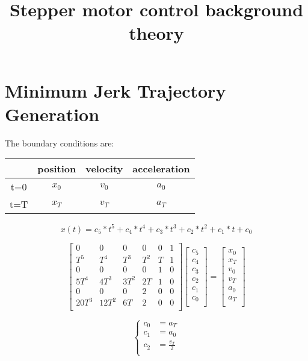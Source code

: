 \documentclass[11pt, a4paper]{article}
\begin{document}
\title{Stepper motor control background theory} 
\date{}
\maketitle


\section{Minimum Jerk Trajectory Generation}


The boundary conditions are:

\begin{center}
    \begin{tabular}{ |c|c|c|c| }
        \hline
            & position & velocity & acceleration \\
        \hline
        t=0 & $x_0$ & $v_0$ & $a_0$ \\
        \hline
        t=T & $x_T$ & $v_T$ & $a_T$ \\
        \hline
    \end{tabular}
    \label{tab:mjt_bc}
\end{center}


\begin{equation}
    x(t) = c_5 * t^5 + c_4 * t^4 + c_3 * t^3 + c_2 * t^2 + c_1 * t + c_0
    \label{eq:mjt_xt}
\end{equation}

\begin{equation}
    \begin{bmatrix}
        0 & 0 & 0 & 0 & 0 & 1 \\
        T^5 & T^4 & T^3 & T^2 & T & 1 \\
        0 & 0 & 0 & 0 & 1 & 0 \\
        5T^4 & 4T^3 & 3T^2 & 2T & 1 & 0 \\
        0 & 0 & 0 & 2 & 0 & 0 \\
        20T^3 & 12T^2 & 6T & 2 & 0 & 0 \\    
    \end{bmatrix}
    \begin{bmatrix}
        c_5 \\
        c_4 \\
        c_3 \\
        c_2 \\
        c_1 \\
        c_0 \\
    \end{bmatrix}
    = 
    \begin{bmatrix}
        x_0 \\
        x_T \\
        v_0 \\
        v_T \\
        a_0 \\
        a_T \\
    \end{bmatrix}
\end{equation}

\begin{equation}
    \left\{
        \begin{alignedat}{3}
            c_0 &= a_T \\
            c_1 &= a_0 \\
            c_2 &= \frac{v_T}{2} \\
        \end{alignedat}
    \right.
\end{equation}
\end{document}
